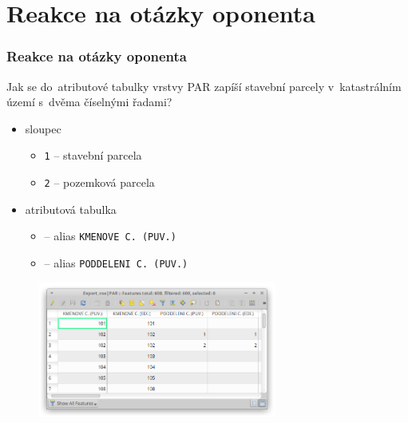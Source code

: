 \documentclass{beamer}
\begin{document}

\section{Reakce na otázky oponenta}

\begin{frame}

\frametitle{Reakce na otázky oponenta}

Jak se do~atributové tabulky vrstvy PAR zapíší stavební parcely v~katastrálním území s~dvěma číselnými řadami?

\begin{itemize}
	\item sloupec \texttt{}
	\begin{itemize}
		\item \texttt{1} – stavební parcela
		\item \texttt{2} – pozemková parcela
	\end{itemize}
	\item atributová tabulka
	\begin{itemize}
		\item \texttt{} – alias \texttt{KMENOVE C. (PUV.)}
		\item \texttt{} – alias \texttt{PODDELENI C. (PUV.)}
	\end{itemize}
\end{itemize}

\begin{figure}[ht]
	\includegraphics[width=0.7\textwidth]{pictures/nacteni-tabulka.png}
\end{figure}

\end{frame}

\end{document}
